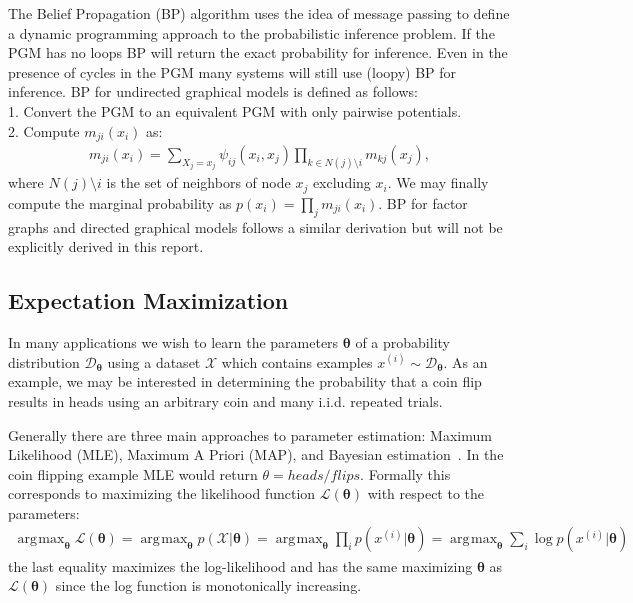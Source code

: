 \documentclass[11pt]{article}
\DeclareMathOperator*{\argmax}{\arg\!\max}
\begin{document}
The Belief Propagation (BP) algorithm uses the idea of message passing to define a dynamic programming approach to the probabilistic inference problem.  If the PGM has no loops BP will return the exact probability for inference.  Even in the presence of cycles in the PGM many systems will still use (loopy) BP for inference.  BP for undirected graphical models is defined as follows:\\
1.  Convert the PGM to an equivalent PGM with only pairwise potentials.\\
2.  Compute $m_{ji}(x_i)$ as:
\begin{gather*}
m_{ji}(x_i) = \sum_{X_j = x_j} \psi_{ij}(x_i, x_j) \prod_{k \in N(j) \setminus i} m_{kj}(x_j),
\end{gather*}
where $N(j) \setminus i$ is the set of neighbors of node $x_j$ excluding $x_i$.  We may finally compute the marginal probability as $p(x_i) = \prod_{j} m_{ji}(x_i)$.  BP for factor graphs and directed graphical models follows a similar derivation but will not be explicitly derived in this report.

\subsection{Expectation Maximization}
In many applications we wish to learn the parameters $\boldsymbol{\theta}$ of a probability distribution $\mathcal{D}_{\boldsymbol{\theta}}$ using a dataset $\mathcal{X}$ which contains examples $x^{(i)} \sim \mathcal{D}_{\boldsymbol{\theta}}$.  As an example, we may be interested in determining the probability that a coin flip results in heads using an arbitrary coin and many i.i.d. repeated trials.

Generally there are three main approaches to parameter estimation: Maximum Likelihood (MLE), Maximum A Priori (MAP), and Bayesian estimation~\cite{Prince:2012:CVM:2344089}.  In the coin flipping example MLE would return $\theta = heads/flips$.  Formally this corresponds to maximizing the likelihood function $\mathcal{L}(\boldsymbol{\theta})$ with respect to the parameters:
\begin{gather*}
\argmax_{\boldsymbol{\theta}} \mathcal{L}(\boldsymbol{\theta})
= \argmax_{\boldsymbol{\theta}} p(\mathcal{X}|\boldsymbol{\theta})
= \argmax_{\boldsymbol{\theta}} \prod_i p(x^{(i)}|\boldsymbol{\theta})
= \argmax_{\boldsymbol{\theta}} \sum_i \log p(x^{(i)}|\boldsymbol{\theta})
\end{gather*}
the last equality maximizes the log-likelihood and has the same maximizing $\boldsymbol{\theta}$ as $\mathcal{L}(\boldsymbol{\theta})$ since the log function is monotonically increasing.
\end{document}
